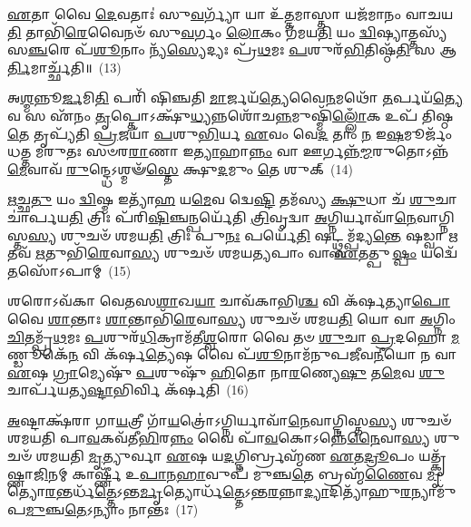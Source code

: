 \-\ul{𑌏}\-𑌤𑌾 𑌵𑍈 \ul{𑌦𑍇}\-𑌵𑌤𑌾𑌃॑ 𑌸𑍁\-\ul{𑌵}\-𑌰𑍍𑌗𑍍𑌯𑌾᳴ 𑌯𑌾 𑌉᳴\-\ul{𑌤𑍍𑌤}\-𑌮𑌾𑌸𑍍𑌤𑌾 𑌯𑌜᳴𑌮𑌾𑌨𑌂 𑌵𑌾𑌚𑌯\-\ul{𑌤𑌿} 𑌤𑌾𑌭𑌿᳴\-\ul{𑌰𑍇}\-𑌵𑍈𑌨𑍞᳴ 𑌸𑍁\-\ul{𑌵}\-𑌰𑍍𑌗𑌂 \ul{𑌲𑍋}\-𑌕𑌂 𑌗᳴𑌮𑌯\-\ul{𑌤𑌿} 𑌯𑌂 \ul{𑌦𑍍𑌵𑌿}\-𑌷𑍍𑌯𑌾𑌤𑍍𑌤𑌸𑍍𑌯᳴ 𑌸\-\ul{𑌞𑍍𑌚}\-𑌰𑍇 𑌪᳴\-\ul{𑌶𑍂}\-𑌨𑌾𑌂 𑌨𑍍𑌯᳴\-\ul{𑌸𑍍𑌯𑍇}\-𑌦𑍍𑌯𑌃 𑌪𑍍𑌰᳴\-\ul{𑌥}\-𑌮𑌃 \ul{𑌪}\-𑌶𑍁𑌰᳴\-\ul{𑌭𑌿}\-𑌤𑌿𑌷𑍍𑌠᳴\-\ul{𑌤𑌿} 𑌸 𑌆\-\ul{𑌰𑍍𑌤𑌿}\-𑌮𑌾𑌰𑍍𑌚𑍍𑌛᳴𑌤𑌿॥~(13)

{\anuvakamend[{\-\ul{𑌪}\-\-\ul{𑌶𑍂}\-𑌨𑌾𑌂 𑌯𑌨𑍍𑌤𑍋\-𑌽𑌗𑍍𑌰𑍇᳴ 𑌜𑍁\-\ul{𑌹𑍋}\-𑌤𑍍𑌯𑌪᳴𑌰𑌿𑌵𑌰𑍍𑌗\-\ul{𑌮𑍇}\-𑌵𑍈𑌨𑍞᳴ 𑌶𑌮𑌯𑌤𑌿 \ul{𑌤𑍍𑌰𑌿}\-\-\ul{𑍞}\-𑌶𑌚𑍍𑌚᳴}]}%

𑌅\-\ul{𑌶𑍍𑌮}\-𑌨𑍍𑌨𑍂\-\ul{𑌰𑍍𑌜}\-𑌮𑌿\-\ul{𑌤𑌿} 𑌪𑌰𑌿᳴ 𑌷𑌿𑌞𑍍𑌚𑌤𑌿 \ul{𑌮𑌾}\-𑌰𑍍𑌜𑌯᳴\-\ul{𑌤𑍍𑌯𑍇}\-𑌵𑍈\-\ul{𑌨}\-𑌮𑌥𑍋᳴ \ul{𑌤}\-𑌰𑍍𑌪𑌯᳴\-\ul{𑌤𑍍𑌯𑍇}\-𑌵 𑌸 𑌏᳴𑌨𑌂 \ul{𑌤𑍃}\-𑌪𑍍𑌤𑍋\-𑌽𑌕𑍍𑌷𑍁᳴\-\ul{𑌧𑍍𑌯}\-𑌨𑍍𑌨𑌶𑍋᳴𑌚\-\ul{𑌨𑍍𑌨}\-𑌮𑍁𑌷𑍍𑌮𑌿᳴\-\ul{𑌲𑍍𑌲𑍋𑌁}\-𑌕 𑌉𑌪᳴ 𑌤𑌿𑌷𑍍𑌠\-\ul{𑌤𑍇} 𑌤𑍃𑌪𑍍𑌯᳴𑌤𑌿 \ul{𑌪𑍍𑌰}\-𑌜𑌯𑌾᳴ \ul{𑌪}\-𑌶𑍁\-\ul{𑌭𑌿}\-𑌰𑍍𑌯 \ul{𑌏}\-𑌵𑌂 𑌵𑍇\-\ul{𑌦} 𑌤𑌾𑌂 \ul{𑌨} 𑌇\-\ul{𑌷}\-𑌮𑍂𑌰𑍍𑌜𑌂᳴ 𑌧𑌤𑍍𑌤 𑌮𑌰𑍁𑌤𑌃 𑌸𑍞𑌰\-\ul{𑌰𑌾}\-𑌣𑌾 𑌇\-\ul{𑌤𑍍𑌯𑌾}\-𑌹𑌾\-\ul{𑌨𑍍𑌨𑌂} 𑌵𑌾 𑌊𑌰𑍍𑌗𑌨𑍍𑌨᳴\-\ul{𑌮𑍍𑌮}\-𑌰𑍁𑌤𑍋\-𑌽𑌨𑍍𑌨᳴\-\ul{𑌮𑍇}\-𑌵𑌾𑌵᳴ \ul{𑌰𑍁}\-𑌨𑍍𑌦𑍍𑌧𑍇\-𑌽𑌶𑍍𑌮𑍟᳴\-\ul{𑌸𑍍𑌤𑍇} 𑌕𑍍𑌷𑍁\-\ul{𑌦}\-𑌮𑍁𑌂 \ul{𑌤𑍇} 𑌶𑍁𑌕𑍍~(14)

\-\ul{𑌋}\-\-\ul{𑌚𑍍𑌛}\-\-\ul{𑌤𑍁} 𑌯𑌂 \ul{𑌦𑍍𑌵𑌿}\-𑌷𑍍𑌮 𑌇𑌤𑍍𑌯𑌾᳴\-\ul{𑌹} 𑌯\-\ul{𑌮𑍇}\-𑌵 𑌦𑍍𑌵𑍇\-\ul{𑌷𑍍𑌟𑌿} 𑌤𑌮᳴𑌸𑍍𑌯 \ul{𑌕𑍍𑌷𑍁}\-𑌧𑌾 𑌚᳴ \ul{𑌶𑍁}\-𑌚𑌾 𑌚𑌾॑𑌰𑍍𑌪𑌯\-\ul{𑌤𑌿} 𑌤𑍍𑌰𑌿𑌃 𑌪᳴𑌰𑌿\-\ul{𑌷𑌿}\-𑌞𑍍𑌚𑌨𑍍𑌪𑌰𑍍𑌯𑍇᳴𑌤𑌿 \ul{𑌤𑍍𑌰𑌿}\-𑌵𑍃𑌦𑍍𑌵𑌾 \ul{𑌅}\-𑌗𑍍𑌨𑌿𑌰𑍍𑌯𑌾𑌵𑌾᳴\-\ul{𑌨𑍇}\-𑌵𑌾𑌗𑍍𑌨𑌿𑌸𑍍𑌤\-\ul{𑌸𑍍𑌯} 𑌶𑍁𑌚𑍞᳴ 𑌶𑌮𑌯\-\ul{𑌤𑌿} 𑌤𑍍𑌰𑌿𑌃 𑌪𑍁\-\ul{𑌨𑌃} 𑌪𑌰𑍍𑌯𑍇᳴\-\ul{𑌤𑌿} 𑌷𑌟𑍍𑌥𑍍𑌸𑌮𑍍𑌪᳴𑌦𑍍𑌯\-\ul{𑌨𑍍𑌤𑍇} 𑌷𑌡𑍍𑌵𑌾 \ul{𑌋}\-𑌤𑌵᳴ \ul{𑌋}\-𑌤𑍁𑌭𑌿᳴\-\ul{𑌰𑍇}\-𑌵𑌾\-\ul{𑌸𑍍𑌯} 𑌶𑍁𑌚𑍞᳴ 𑌶𑌮𑌯\-\ul{𑌤𑍍𑌯}\-𑌪𑌾𑌂 𑌵𑌾 \ul{𑌏}\-𑌤𑌤𑍍𑌪𑍁\-\ul{𑌷𑍍𑌪𑌂} 𑌯𑌦𑍍𑌵𑍇᳴\-\ul{𑌤}\-𑌸𑍋᳴\-𑌽𑌪𑌾𑌮𑍍~(15)

𑌶𑌰𑍋\-𑌽𑌵᳴𑌕𑌾 𑌵𑍇𑌤𑌸\-\ul{𑌶𑌾}\-𑌖\-\ul{𑌯𑌾} 𑌚𑌾𑌵᳴𑌕𑌾𑌭𑌿\-\ul{𑌶𑍍𑌚} 𑌵𑌿 𑌕᳴𑌰𑍍\mbox{}\-\ul{𑌷}\-𑌤𑍍𑌯𑌾\-\ul{𑌪𑍋} 𑌵𑍈 \ul{𑌶𑌾}\-𑌨𑍍𑌤𑌾𑌃 \ul{𑌶𑌾}\-𑌨𑍍𑌤𑌾𑌭𑌿᳴\-\ul{𑌰𑍇}\-𑌵𑌾\-\ul{𑌸𑍍𑌯} 𑌶𑍁𑌚𑍞᳴ 𑌶𑌮𑌯\-\ul{𑌤𑌿} 𑌯𑍋 𑌵𑌾 \ul{𑌅}\-𑌗𑍍𑌨𑌿𑌂 \ul{𑌚𑌿}\-𑌤𑌮𑍍𑌪𑍍𑌰᳴\-\ul{𑌥}\-𑌮𑌃 \ul{𑌪}\-𑌶𑍁𑌰᳴\-\ul{𑌧𑌿}\-𑌕𑍍𑌰𑌾𑌮᳴𑌤𑍀\-\ul{𑌶𑍍𑌵}\-𑌰𑍋 𑌵𑍈 𑌤𑍞 \ul{𑌶𑍁}\-𑌚𑌾 \ul{𑌪𑍍𑌰}\-𑌦𑌹𑍋 \ul{𑌮}\-𑌣𑍍𑌡𑍂𑌕𑍇᳴\-\ul{𑌨} 𑌵𑌿 𑌕᳴𑌰𑍍\mbox{}𑌷\-\ul{𑌤𑍍𑌯𑍇}\-𑌷 𑌵𑍈 𑌪᳴\-\ul{𑌶𑍂}\-𑌨𑌾𑌮᳴𑌨𑍁𑌪𑌜𑍀𑌵\-\ul{𑌨𑍀}\-𑌯𑍋 𑌨 𑌵𑌾 \ul{𑌏}\-𑌷 \ul{𑌗𑍍𑌰𑌾}\-𑌮𑍍𑌯𑍇𑌷𑍁᳴ \ul{𑌪}\-𑌶𑍁𑌷𑍁᳴ \ul{𑌹𑌿}\-𑌤𑍋 𑌨𑌾\-\ul{𑌰}\-𑌣𑍍𑌯𑍇\-\ul{𑌷𑍁} 𑌤\-\ul{𑌮𑍇}\-𑌵 \ul{𑌶𑍁}\-𑌚𑌾𑌰𑍍𑌪᳴𑌯𑌤𑍍𑌯\-\ul{𑌷𑍍𑌟𑌾}\-𑌭𑌿𑌰𑍍𑌵𑌿 𑌕᳴𑌰𑍍\mbox{}𑌷𑌤𑌿~(16)

\-\ul{𑌅}\-𑌷𑍍𑌟𑌾𑌕𑍍𑌷᳴𑌰𑌾 𑌗𑌾\-\ul{𑌯}\-𑌤𑍍𑌰𑍀 𑌗𑌾᳴\-\ul{𑌯}\-𑌤𑍍𑌰𑍋॑\-𑌽𑌗𑍍𑌨𑌿𑌰𑍍𑌯𑌾𑌵𑌾᳴\-\ul{𑌨𑍇}\-𑌵𑌾𑌗𑍍𑌨𑌿𑌸𑍍𑌤\-\ul{𑌸𑍍𑌯} 𑌶𑍁𑌚𑍞᳴ 𑌶𑌮𑌯𑌤𑌿 𑌪𑌾\-\ul{𑌵}\-𑌕𑌵᳴𑌤𑍀\-\ul{𑌭𑌿}\-𑌰\-\ul{𑌨𑍍𑌨𑌂} 𑌵𑍈 𑌪𑌾᳴\-\ul{𑌵}\-𑌕𑍋\-𑌽𑌨𑍍𑌨𑍇᳴\-\ul{𑌨𑍈}\-𑌵𑌾\-\ul{𑌸𑍍𑌯} 𑌶𑍁𑌚𑍞᳴ 𑌶𑌮𑌯𑌤𑌿 \ul{𑌮𑍃}\-𑌤𑍍𑌯𑍁𑌰𑍍𑌵𑌾 \ul{𑌏}\-𑌷 𑌯\-\ul{𑌦}\-𑌗𑍍𑌨𑌿𑌰𑍍𑌬𑍍𑌰𑌹𑍍𑌮᳴𑌣 \ul{𑌏}\-𑌤\-\ul{𑌦𑍍𑌰𑍂}\-𑌪𑌂 𑌯𑌤𑍍𑌕𑍃᳴𑌷𑍍𑌣𑌾\-\ul{𑌜𑌿}\-𑌨𑌮𑍍 𑌕𑌾𑌰𑍍\mbox{}𑌷𑍍𑌣𑍀᳴ 𑌉\-\ul{𑌪𑌾}\-𑌨\-\ul{𑌹𑌾}\-𑌵𑍁𑌪᳴ 𑌮𑍁𑌞𑍍𑌚\-\ul{𑌤𑍇} 𑌬𑍍𑌰𑌹𑍍𑌮᳴\-\ul{𑌣𑍈}\-𑌵 \ul{𑌮𑍃}\-𑌤𑍍𑌯𑍋\-\ul{𑌰}\-𑌨𑍍𑌤𑌰𑍍𑌧᳴\-\ul{𑌤𑍍𑌤𑍇}\-\-𑌽𑌨𑍍𑌤\-\ul{𑌰𑍍𑌮𑍃}\-𑌤𑍍𑌯𑍋𑌰𑍍𑌧᳴\-\ul{𑌤𑍍𑌤𑍇}\-\-𑌽𑌨𑍍𑌤\-\ul{𑌰}\-𑌨𑍍𑌨𑌾\-\ul{𑌦𑍍𑌯𑌾}\-𑌦𑌿𑌤𑍍𑌯𑌾᳴𑌹𑍁\-\ul{𑌰}\-𑌨𑍍𑌯𑌾𑌮𑍁᳴𑌪\-\ul{𑌮𑍁}\-𑌞𑍍𑌚\-\ul{𑌤𑍇}\-\-𑌽𑌨𑍍𑌯𑌾𑌂 𑌨𑌾𑌨𑍍𑌤𑌃~(17)

